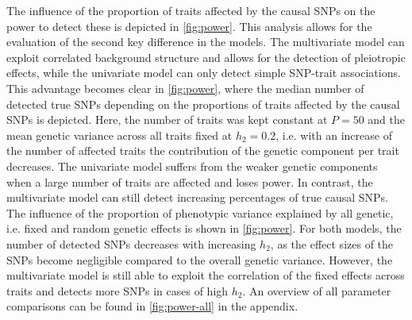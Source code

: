 The influence of the proportion of traits affected by the causal SNPs on the power to detect these is depicted in \cref{fig:power}. This analysis allows for the evaluation of the second key difference in the models. The multivariate model can exploit correlated background structure and allows for the detection of pleiotropic effects, while the univariate model can only detect simple SNP-trait associations. This advantage becomes clear in \cref{fig:power}, where the median number of detected true SNPs depending on the proportions of traits affected by the causal SNPs is depicted. Here, the number of traits was kept constant at \(P=50\) and the mean genetic variance across all traits fixed at \(h_2=0.2\), i.e. with an increase of the number of affected traits the contribution of the genetic component per trait decreases. The univariate model suffers from the weaker genetic components when a large number of traits are affected and loses power. In contrast, the multivariate model can still detect increasing percentages of true causal SNPs. The influence of the proportion of phenotypic variance explained by all genetic, i.e. fixed and random genetic effects is shown in \cref{fig:power}. For both models, the number of detected SNPs decreases with increasing \(h_2\), as the effect sizes of the SNPs become negligible compared to the overall genetic variance. However, the multivariate model is still able to exploit the correlation of the fixed effects across traits and detects more SNPs in cases of high \(h_2\). An overview of all parameter comparisons can be found in \cref{fig:power-all} in the appendix. 
 